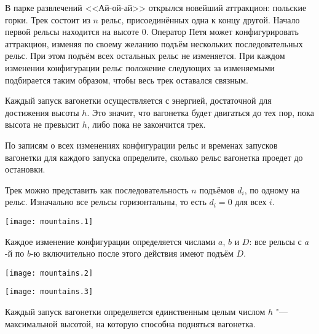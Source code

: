 
В парке развлечений <<Ай-ой-ай>> открылся новейший аттракцион: польские горки.
Трек состоит из $n$ рельс, присоединённых одна к концу другой. Начало первой
рельсы находится на высоте $0$. Оператор Петя может конфигурировать
аттракцион, изменяя по своему желанию подъём нескольких последовательных
рельс. При этом подъём всех остальных рельс не изменяется. При каждом
изменении конфигурации рельс положение следующих за изменяемыми подбирается
таким образом, чтобы весь трек оставался связным.

Каждый запуск вагонетки осуществляется с энергией, достаточной для достижения
высоты $h$. Это значит, что вагонетка будет двигаться до тех пор, пока высота
не превысит $h$, либо пока не закончится трек.

По записям о всех изменениях конфигурации рельс и временах запусков вагонетки
для каждого запуска определите, сколько рельс вагонетка проедет до остановки.

Трек можно представить как последовательность $n$ подъёмов $d_i$, по одному
на рельс. Изначально все рельсы горизонтальны, то есть $d_i = 0$ для всех $i$.

\texttt{[image: mountains.1]}

Каждое изменение конфигурации определяется числами $a$, $b$ и $D$: все рельсы
с $a$-й по $b$-ю включительно после этого действия имеют подъём $D$.

\texttt{[image: mountains.2]}

\texttt{[image: mountains.3]}

Каждый запуск вагонетки определяется единственным целым числом $h$ "---
максимальной высотой, на которую способна подняться вагонетка.

